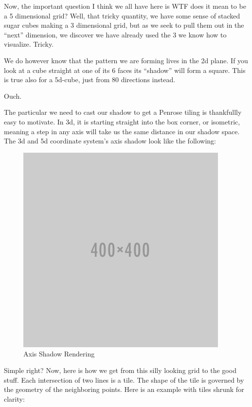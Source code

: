\documentclass{amsart}
\begin{document}
Now, the important question I think we all have here is WTF does it mean to be a 5 dimensional grid? 
Well, that tricky quantity, we have some sense of stacked sugar cubes making a 3 dimensional grid, but as we seek 
to pull them out in the “next” dimension, we discover we have already used the 3 we know how to visualize. Tricky. 

We do however know that the pattern we are forming lives in the 2d plane. If you look at a cube straight at one 
of its 6 faces its ``shadow'' will form a square. This is true also for a 5d-cube, just from 80 directions instead. 

Ouch.

The particular we need to cast our shadow to get a Penrose tiling is thankfullly easy to motivate. In 3d,
it is starting straight into the box corner, or isometric, meaning a step in any axis will take us the same
distance in our shadow space. The 3d and 5d coordinate system’s axis shadow look like the following:

\begin{figure}[h]
  \centering
  \includegraphics[width=0.8\linewidth]{figures/placeholder}
  \caption{Axis Shadow Rendering}
  \label{fig:axis-shadow}
\end{figure}

Simple right? Now, here is how we get from this silly looking grid to the good stuff. Each intersection of two
lines is a tile. The shape of the tile is governed by the geometry of the neighboring points. Here is an example
with tiles shrunk for clarity:
\end{document}
